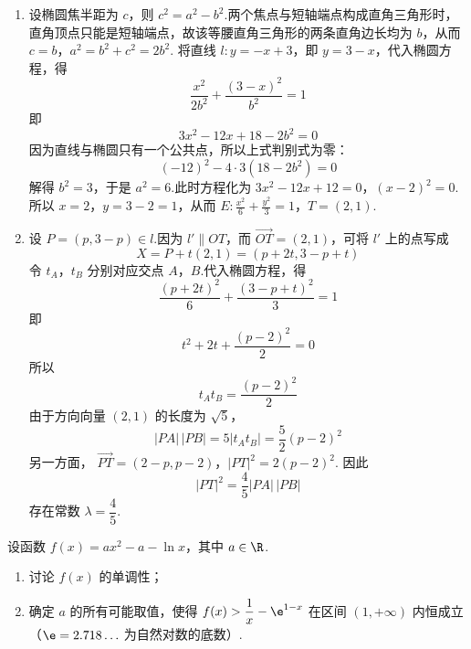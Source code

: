 \begin{solution}
\begin{enumerate}
\item 设椭圆焦半距为 \(c\)，则 \(c^2=a^2-b^2\).两个焦点与短轴端点构成直角三角形时，直角顶点只能是短轴端点，故该等腰直角三角形的两条直角边长均为 \(b\)，从而
\(c=b\)，\(a^2=b^2+c^2=2b^2\).
将直线 \(l:y=-x+3\)，即 \(y=3-x\)，代入椭圆方程，得
\[
\frac{x^2}{2b^2}+\frac{(3-x)^2}{b^2}=1
\]
即
\[
3x^2-12x+18-2b^2=0
\]
因为直线与椭圆只有一个公共点，所以上式判别式为零：
\[
(-12)^2-4\cdot3(18-2b^2)=0
\]
解得 \(b^2=3\)，于是 \(a^2=6\).此时方程化为
\(3x^2-12x+12=0\)，\((x-2)^2=0\).
所以 \(x=2\)，\(y=3-2=1\)，从而
\(E:\frac{x^2}{6}+\frac{y^2}{3}=1\)，\(T=(2,1)\).

\item 设 \(P=(p,3-p)\in l\).因为 \(l'\parallel OT\)，而 \(\overrightarrow{OT}=(2,1)\)，可将 \(l'\) 上的点写成
\[
X=P+t(2,1)=(p+2t,3-p+t)
\]
令 \(t_A\)，\(t_B\) 分别对应交点 \(A\)，\(B\).代入椭圆方程，得
\[
\frac{(p+2t)^2}{6}+\frac{(3-p+t)^2}{3}=1
\]
即
\[
t^2+2t+\frac{(p-2)^2}{2}=0
\]
所以
\[
t_A t_B=\frac{(p-2)^2}{2}
\]
由于方向向量 \((2,1)\) 的长度为 \(\sqrt5\)，
\[
|PA|\,|PB|=5|t_A t_B|=\frac52(p-2)^2
\]
另一方面，
\(\overrightarrow{PT}=(2-p,p-2)\)，\(|PT|^2=2(p-2)^2\).
因此
\[
|PT|^2=\frac45|PA|\,|PB|
\]
存在常数 \(\lambda=\dfrac45\).
\end{enumerate}
\end{solution}


\begin{problem}
设函数 \(f(x)=ax^2-a-\ln x\)，其中 \(a\in\R\).

\begin{enumerate}
\item 讨论 \(f(x)\) 的单调性；
\item 确定 \(a\) 的所有可能取值，使得 \(f(x)>\dfrac1x-\e^{1-x}\) 在区间 \(\left(1,+\infty\right)\) 内恒成立（\(\e=2.718\ldots\) 为自然对数的底数）.
\end{enumerate}
\end{problem}

